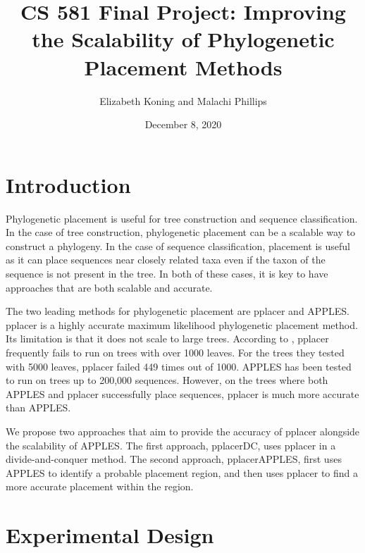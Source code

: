 \documentclass[10pt]{article}
\title{CS 581 Final Project: Improving the Scalability of Phylogenetic Placement Methods}
\author{Elizabeth Koning and Malachi Phillips}
\date{December 8, 2020}
\begin{document}
\maketitle

\section{Introduction}

Phylogenetic placement is useful for tree construction and sequence classification. In the case of tree construction, phylogenetic placement can be a scalable way to construct a phylogeny. In the case of sequence classification, placement is useful as it can place sequences near closely related taxa even if the taxon of the sequence is not present in the tree. In both of these cases, it is key to have approaches that are both scalable and accurate.

The two leading methods for phylogenetic placement are pplacer and APPLES. pplacer \cite{matsen_pplacer_2010} is a highly accurate maximum likelihood phylogenetic placement method. Its limitation is that it does not scale to large trees. According to \cite{balaban_apples_2020}, pplacer frequently fails to run on trees with over 1000 leaves. For the trees they tested with 5000 leaves, pplacer failed 449 times out of 1000. APPLES has been tested to run on trees up to 200,000 sequences. However, on the trees where both APPLES and pplacer successfully place sequences, pplacer is much more accurate than APPLES.

We propose two approaches that aim to provide the accuracy of pplacer alongside the scalability of APPLES. The first approach, pplacerDC, uses pplacer in a divide-and-conquer method. The second approach, pplacerAPPLES, first uses APPLES to identify a probable placement region, and then uses pplacer to find a more accurate placement within the region.


\section{Experimental Design}


\end{document}
